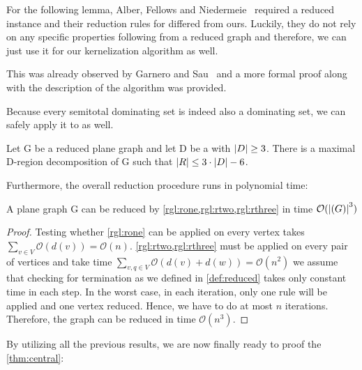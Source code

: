 For the following lemma, Alber, Fellows and Niedermeie~\cite{Alber2004} required a reduced instance and their reduction rules for \pdom differed from ours. Luckily, they do not rely on any specific properties following from a reduced graph and therefore, we can just use it for our kernelization algorithm as well.

This was already observed by Garnero and Sau~\cite{Garnero2018} and a more formal proof along with the description of the algorithm was provided.

Because every semitotal dominating set is indeed also a dominating set, we can safely apply it to \psdom as well. 

\begin{lemma}\label{lemma:numRegions}
    Let G be a reduced plane graph and let D be a \sdom with $\abs{D}\geq 3$. There is a maximal D-region decomposition of G such that $\abs{R} \leq 3 \cdot \abs{D} - 6$.
\end{lemma}

Furthermore, the overall reduction procedure runs in polynomial time:

\begin{lemma}\label{lemma:runtime}
    A plane graph G can be reduced by \cref{rgl:rone,rgl:rtwo,rgl:rthree} in time $\mathcal{O}(\abs{(G)}^3)$
\end{lemma}
\begin{proof} 
Testing whether \cref{rgl:rone} can be applied on every vertex takes $\sum_{v\in V} \mathcal{O}(d(v)) = \mathcal{O}(n)$.
\cref{rgl:rtwo,rgl:rthree} must be applied on every pair of vertices and take time $\sum_{v,q \in V}\mathcal{O}(d(v) + d(w)) = \mathcal{O}(n^2)$
we assume that checking for termination as we defined in \cref{def:reduced} takes only constant time in each step.
In the worst case, in each iteration, only one rule will be applied and one vertex reduced. 
Hence, we have to do at most $n$ iterations.
Therefore, the graph can be reduced in time $\mathcal{O}(n^3)$.
\end{proof}

\noindent By utilizing all the previous results, we are now finally ready to proof the \cref{thm:central}: 

\centraltheo*

